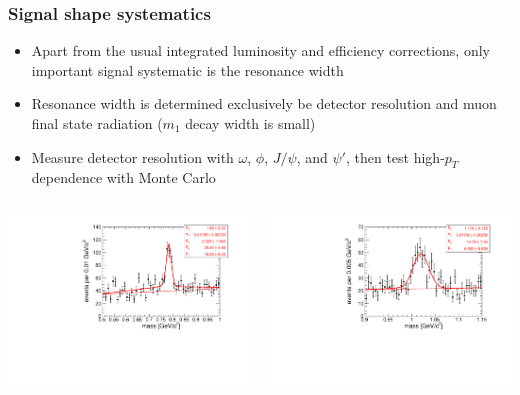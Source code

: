 \documentclass[compress]{beamer}
\begin{document}
\begin{frame}
\frametitle{Signal shape systematics}

\begin{itemize}
\item Apart from the usual integrated luminosity and efficiency
  corrections, only important signal systematic is the resonance width
\item Resonance width is determined exclusively be detector resolution
  and muon final state radiation ($m_1$ decay width is small)
\item Measure detector resolution with $\omega$, $\phi$, $J/\psi$, and
  $\psi'$, then test high-$p_T$ dependence with Monte Carlo
\end{itemize}

\begin{columns}
\includegraphics[width=\linewidth]{respeak_omega.pdf}

\includegraphics[width=\linewidth]{respeak_phi.pdf}


\end{columns}
\end{frame}
\end{document}
